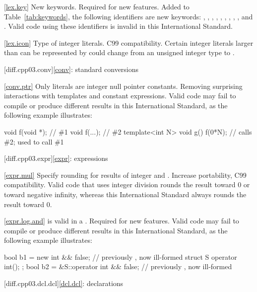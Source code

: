 \ref{lex.key}
\change New keywords.
\rationale Required for new features.
\effect
Added to Table~\ref{tab:keywords}, the following identifiers are new keywords:
,
,
,
,
,
,
,
,
,
and
.
Valid \CppIII code using these identifiers is invalid in this International
Standard.

\ref{lex.icon}
\change Type of integer literals.
\rationale C99 compatibility.
\effect
Certain integer literals larger than can be represented by  could
change from an unsigned integer type to .

[diff.cpp03.conv]{\ref{conv}: standard conversions}

\ref{conv.ptr}
\change Only literals are integer null pointer constants.
\rationale Removing surprising interactions with templates and constant
expressions.
\effect Valid \CppIII code may fail to compile or produce different results in
this International Standard, as the following example illustrates:

\begin{codeblock}
void f(void *);  // \#1
void f(...);     // \#2
template<int N> void g() {
  f(0*N);        // calls \#2; used to call \#1
}
\end{codeblock}

[diff.cpp03.expr]{\ref{expr}: expressions}

\ref{expr.mul}
\change Specify rounding for results of integer \tcode{/} and \tcode{\%}.
\rationale Increase portability, C99 compatibility.
\effect
Valid \CppIII code that uses integer division rounds the result toward 0 or
toward negative infinity, whereas this International Standard always rounds
the result toward 0.

\ref{expr.log.and}
\change \tcode{\&\&} is valid in a .
\rationale Required for new features.
\effect
Valid \CppIII code may fail to compile or produce different results in
this International Standard, as the following example illustrates:

\begin{codeblock}
bool b1 = new int && false;           // previously , now ill-formed
struct S { operator int(); };
bool b2 = &S::operator int && false;  // previously , now ill-formed
\end{codeblock}

[diff.cpp03.dcl.dcl]{\ref{dcl.dcl}: declarations}

